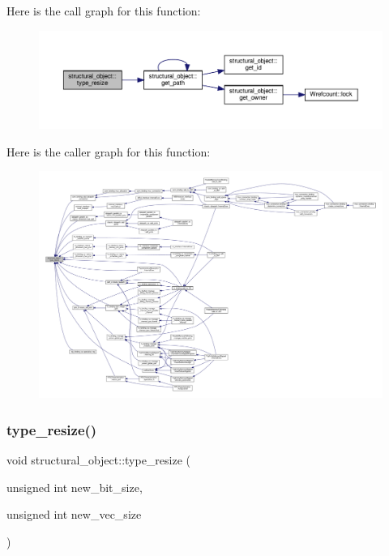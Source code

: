 Here is the call graph for this function\+:
\nopagebreak
\begin{figure}[H]
\begin{center}
\leavevmode
\includegraphics[width=350pt]{d8/da3/classstructural__object_a9a5e80fe9e81e9ea7e24b05733518e58_cgraph}
\end{center}
\end{figure}
Here is the caller graph for this function\+:
\nopagebreak
\begin{figure}[H]
\begin{center}
\leavevmode
\includegraphics[width=350pt]{d8/da3/classstructural__object_a9a5e80fe9e81e9ea7e24b05733518e58_icgraph}
\end{center}
\end{figure}
\mbox{\label{classstructural__object_ad14f4fa94f96ad1e6709027ef7001f37}} 
\subsubsection{\texorpdfstring{type\+\_\+resize()}{type\_resize()}\hspace{0.1cm}{\footnotesize\ttfamily [2/2]}}
{\footnotesize\ttfamily void structural\+\_\+object\+::type\+\_\+resize (\begin{DoxyParamCaption}\item[{unsigned int}]{new\+\_\+bit\+\_\+size,  }\item[{unsigned int}]{new\+\_\+vec\+\_\+size }\end{DoxyParamCaption})}



